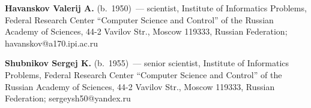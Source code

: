 \noindent
\textbf{Havanskov Valerij A.} (b.\ 1950)~---
scientist, Institute of Informatics Problems, Federal Research Center ``Computer
Science and Control'' of the Russian Academy of Sciences, 44-2 Vavilov Str.,
Moscow 119333, Russian Federation; havanskov@a170.ipi.ac.ru

\vspace*{4pt}


\noindent
\textbf{Shubnikov Sergej K.} (b.\ 1955)~---
senior scientist, Institute of Informatics Problems, Federal Research Center
``Computer Science and Control'' of the Russian Academy of Sciences, 44-2 Vavilov
Str., Moscow 119333, Russian Federation; sergeysh50@yandex.ru

\label{end\stat}


\renewcommand{\bibname}{\protect\rm Литература}


